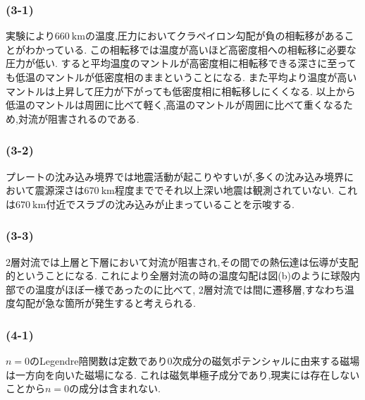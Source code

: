 \subsubsection*{(3-1)}
実験により$660\ \si{\kilo\metre}$の温度,圧力においてクラペイロン勾配が負の相転移があることがわかっている.
この相転移では温度が高いほど高密度相への相転移に必要な圧力が低い.
すると平均温度のマントルが高密度相に相転移できる深さに至っても低温のマントルが低密度相のままということになる.
また平均より温度が高いマントルは上昇して圧力が下がっても低密度相に相転移しにくくなる.
以上から低温のマントルは周囲に比べて軽く,高温のマントルが周囲に比べて重くなるため,対流が阻害されるのである.
\subsubsection*{(3-2)}
プレートの沈み込み境界では地震活動が起こりやすいが,多くの沈み込み境界において震源深さは$670\ \si{\kilo\metre}$程度まででそれ以上深い地震は観測されていない.
これは$670\ \si{\kilo\metre}$付近でスラブの沈み込みが止まっていることを示唆する.
\subsubsection*{(3-3)}
2層対流では上層と下層において対流が阻害され,その間での熱伝達は伝導が支配的ということになる.
これにより全層対流の時の温度勾配は図(b)のように球殻内部での温度がほぼ一様であったのに比べて,
2層対流では間に遷移層,すなわち温度勾配が急な箇所が発生すると考えられる.
\subsubsection*{(4-1)}
$n=0$のLegendre陪関数は定数であり0次成分の磁気ポテンシャルに由来する磁場は一方向を向いた磁場になる.
これは磁気単極子成分であり,現実には存在しないことから$n=0$の成分は含まれない.
